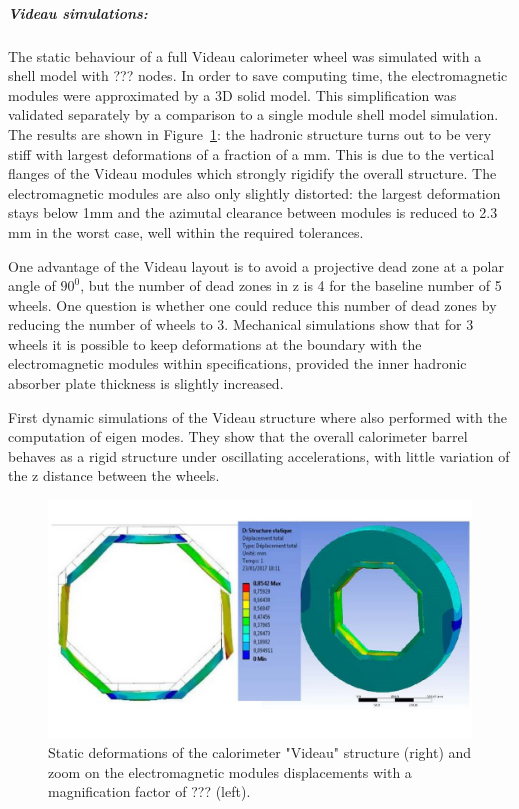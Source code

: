 \subparagraph{\textbf{Videau simulations:}} The static behaviour of a full Videau calorimeter wheel was simulated with a shell model with ??? nodes. In order to save computing time, the electromagnetic modules were approximated by a 3D solid model. This simplification was validated separately by a comparison to a single module shell model simulation. The results are shown in Figure~\ref{fig:integration:Videau_deformations}: the hadronic structure turns out to be very stiff with largest deformations of a fraction of a mm. This is due to the vertical flanges of the Videau modules which strongly rigidify the overall structure. The electromagnetic modules are also only slightly distorted: the largest deformation stays below 1mm and the azimutal clearance between modules is reduced to 2.3 mm in the worst case, well within the required tolerances. 

One advantage of the Videau layout is to avoid a projective dead zone at a polar angle of $90^0$, but the number of dead zones in z is 4 for the baseline number of 5 wheels. One question is whether one could reduce this number of dead zones by reducing the number of wheels to 3. Mechanical simulations show that for 3 wheels it is possible to keep deformations at the boundary with the electromagnetic modules within specifications, provided the inner hadronic absorber plate thickness is slightly increased.

First dynamic simulations of the Videau structure where also performed with the computation of eigen modes. They show that the overall calorimeter barrel behaves as a rigid structure under oscillating accelerations, with little variation of the z distance between the wheels. 


\begin{figure}[t!]
\centering
\includegraphics[width=1.0\hsize]{Integration/fig/Videau_deformations.jpg}
\caption{\label{fig:integration:Videau_deformations}Static deformations of the calorimeter "Videau" structure (right) and zoom on the electromagnetic modules displacements with a magnification factor of ??? (left).}
\end{figure}

